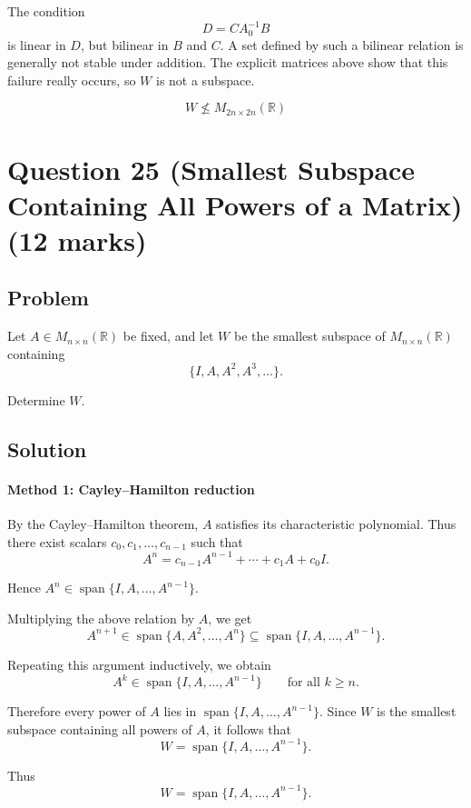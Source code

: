 \documentclass[12pt]{article}
\newcommand{\Span}{\operatorname{span}}
\begin{document}
The condition
\[
D=CA_0^{-1}B
\]
is linear in \(D\), but bilinear in \(B\) and \(C\). A set defined by such a bilinear relation is generally not stable under addition. The explicit matrices above show that this failure really occurs, so \(W\) is not a subspace.

\[
\boxed{W\not\le M_{2n\times 2n}(\mathbb R)}
\]

\newpage
\section{Question 25 (Smallest Subspace Containing All Powers of a Matrix) \hfill (12 marks)}
\subsection{Problem}

Let \(A\in M_{n\times n}(\mathbb R)\) be fixed, and let \(W\) be the smallest subspace of \(M_{n\times n}(\mathbb R)\) containing
\[
\{I,A,A^2,A^3,\dots\}.
\]

Determine \(W\).

\subsection{Solution}

\paragraph{Method 1: Cayley--Hamilton reduction}

By the Cayley--Hamilton theorem, \(A\) satisfies its characteristic polynomial. Thus there exist scalars \(c_0,c_1,\dots,c_{n-1}\) such that
\[
A^n=c_{n-1}A^{n-1}+\cdots+c_1A+c_0I.
\]

Hence \(A^n\in\Span\{I,A,\dots,A^{n-1}\}\).

Multiplying the above relation by \(A\), we get
\[
A^{n+1}\in\Span\{A,A^2,\dots,A^n\}\subseteq \Span\{I,A,\dots,A^{n-1}\}.
\]

Repeating this argument inductively, we obtain
\[
A^k\in\Span\{I,A,\dots,A^{n-1}\}
\qquad
\text{for all }k\ge n.
\]

Therefore every power of \(A\) lies in \(\Span\{I,A,\dots,A^{n-1}\}\). Since \(W\) is the smallest subspace containing all powers of \(A\), it follows that
\[
W=\Span\{I,A,\dots,A^{n-1}\}.
\]

Thus
\[
\boxed{W=\Span\{I,A,\dots,A^{n-1}\}}.
\]
\end{document}
